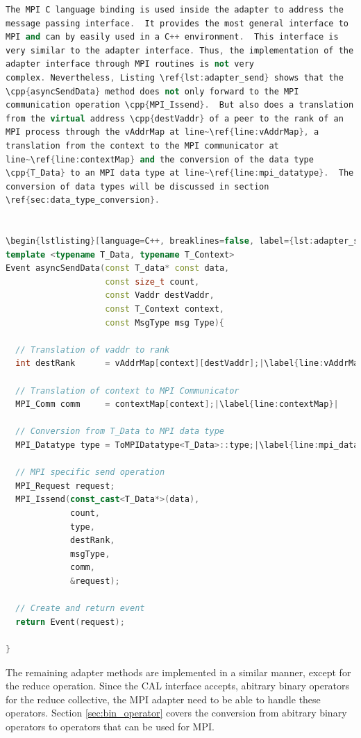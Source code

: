 \begin{lstlisting}[language=C++, breaklines=false, label={lst:binary_function}]
The MPI C language binding is used inside the adapter to address the
message passing interface.  It provides the most general interface to
MPI and can by easily used in a C++ environment.  This interface is
very similar to the adapter interface. Thus, the implementation of the
adapter interface through MPI routines is not very
complex. Nevertheless, Listing \ref{lst:adapter_send} shows that the
\cpp{asyncSendData} method does not only forward to the MPI
communication operation \cpp{MPI_Issend}.  But also does a translation
from the virtual address \cpp{destVaddr} of a peer to the rank of an
MPI process through the vAddrMap at line~\ref{line:vAddrMap}, a
translation from the context to the MPI communicator at
line~\ref{line:contextMap} and the conversion of the data type
\cpp{T_Data} to an MPI data type at line~\ref{line:mpi_datatype}.  The
conversion of data types will be discussed in section
\ref{sec:data_type_conversion}.


\begin{lstlisting}[language=C++, breaklines=false, label={lst:adapter_send},escapechar=|]
template <typename T_Data, typename T_Context>      
Event asyncSendData(const T_data* const data, 
                    const size_t count, 
                    const Vaddr destVaddr, 
                    const T_Context context, 
                    const MsgType msg Type){    

  // Translation of vaddr to rank
  int destRank      = vAddrMap[context][destVaddr];|\label{line:vAddrMap}|

  // Translation of context to MPI Communicator
  MPI_Comm comm     = contextMap[context];|\label{line:contextMap}|

  // Conversion from T_Data to MPI data type
  MPI_Datatype type = ToMPIDatatype<T_Data>::type;|\label{line:mpi_datatype}|

  // MPI specific send operation                                                                            
  MPI_Request request; 
  MPI_Issend(const_cast<T_Data*>(data), 
             count, 
             type,
             destRank, 
             msgType,
             comm,
             &request);

  // Create and return event
  return Event(request);                                                                                                       

}  
\end{lstlisting}

The remaining adapter methods are implemented in a similar manner,
except for the reduce operation. Since the CAL interface accepts,
abitrary binary operators for the reduce collective, the MPI
adapter need to be able to handle these operators. Section
\ref{sec:bin_operator} covers the conversion from abitrary
binary operators to operators that can be used for MPI.

